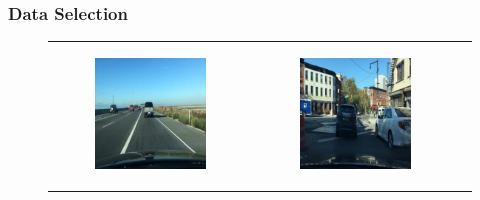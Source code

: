 \subsubsection{Data Selection}
\setlength{\subfigwidth}{45mm}
\setlength{\horspace}{.3\textwidth}
\begin{figure}
    \centering
    \begin{tabular}{p{\horspace} p{\horspace} p{\horspace}}
    \begin{subfigure}[b]{\subfigwidth}
        \includegraphics[width=\subfigwidth]{images/gpt4/s1.jpg}
    \end{subfigure}
    \hfill &
    \begin{subfigure}[b]{\subfigwidth}
        \includegraphics[width=\subfigwidth]{images/gpt4/s2.jpg}

\end{subfigure}
\end{tabular}
\end{figure}
